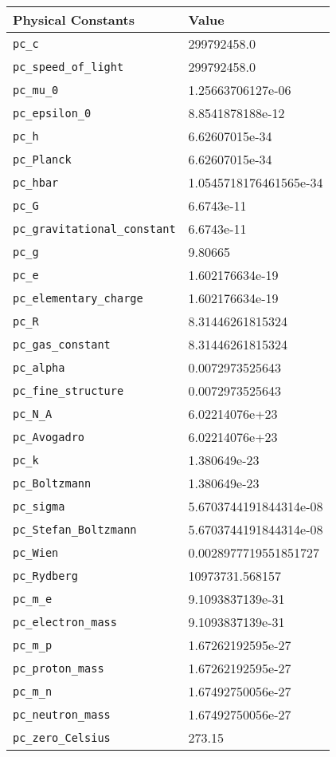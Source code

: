 \begin{tabular}{ll} \hline
Physical Constants & Value  \\ \hline
{\tt pc\_c} \index{pc\_c}  & 299792458.0 \\
{\tt pc\_speed\_of\_light} \index{pc\_speed\_of\_light}  & 299792458.0 \\
{\tt pc\_mu\_0} \index{pc\_mu\_0}  & 1.25663706127e-06 \\
{\tt pc\_epsilon\_0} \index{pc\_epsilon\_0}  & 8.8541878188e-12 \\
{\tt pc\_h} \index{pc\_h}  & 6.62607015e-34 \\
{\tt pc\_Planck} \index{pc\_Planck}  & 6.62607015e-34 \\
{\tt pc\_hbar} \index{pc\_hbar}  & 1.0545718176461565e-34 \\
{\tt pc\_G} \index{pc\_G}  & 6.6743e-11 \\
{\tt pc\_gravitational\_constant} \index{pc\_gravitational\_constant}  & 6.6743e-11 \\
{\tt pc\_g} \index{pc\_g}  & 9.80665 \\
{\tt pc\_e} \index{pc\_e}  & 1.602176634e-19 \\
{\tt pc\_elementary\_charge} \index{pc\_elementary\_charge}  & 1.602176634e-19 \\
{\tt pc\_R} \index{pc\_R}  & 8.31446261815324 \\
{\tt pc\_gas\_constant} \index{pc\_gas\_constant}  & 8.31446261815324 \\
{\tt pc\_alpha} \index{pc\_alpha}  & 0.0072973525643 \\
{\tt pc\_fine\_structure} \index{pc\_fine\_structure}  & 0.0072973525643 \\
{\tt pc\_N\_A} \index{pc\_N\_A}  & 6.02214076e+23 \\
{\tt pc\_Avogadro} \index{pc\_Avogadro}  & 6.02214076e+23 \\
{\tt pc\_k} \index{pc\_k}  & 1.380649e-23 \\
{\tt pc\_Boltzmann} \index{pc\_Boltzmann}  & 1.380649e-23 \\
{\tt pc\_sigma} \index{pc\_sigma}  & 5.6703744191844314e-08 \\
{\tt pc\_Stefan\_Boltzmann} \index{pc\_Stefan\_Boltzmann}  & 5.6703744191844314e-08 \\
{\tt pc\_Wien} \index{pc\_Wien}  & 0.0028977719551851727 \\
{\tt pc\_Rydberg} \index{pc\_Rydberg}  & 10973731.568157 \\
{\tt pc\_m\_e} \index{pc\_m\_e}  & 9.1093837139e-31 \\
{\tt pc\_electron\_mass} \index{pc\_electron\_mass}  & 9.1093837139e-31 \\
{\tt pc\_m\_p} \index{pc\_m\_p}  & 1.67262192595e-27 \\
{\tt pc\_proton\_mass} \index{pc\_proton\_mass}  & 1.67262192595e-27 \\
{\tt pc\_m\_n} \index{pc\_m\_n}  & 1.67492750056e-27 \\
{\tt pc\_neutron\_mass} \index{pc\_neutron\_mass}  & 1.67492750056e-27 \\
{\tt pc\_zero\_Celsius} \index{pc\_zero\_Celsius}  & 273.15 \\
\end{tabular}
